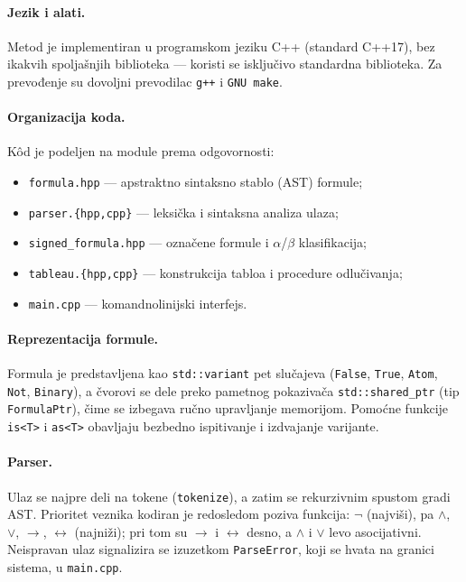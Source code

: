 \documentclass[a4paper,10pt]{article}
\begin{document}
\paragraph{Jezik i alati.}
Metod je implementiran u programskom jeziku C++ (standard C++17), bez ikakvih
spoljašnjih biblioteka --- koristi se isključivo standardna biblioteka. Za
prevođenje su dovoljni prevodilac \texttt{g++} i \texttt{GNU make}.

\paragraph{Organizacija koda.}
Kôd je podeljen na module prema odgovornosti:
\begin{itemize}
 \item \texttt{formula.hpp} --- apstraktno sintaksno stablo (AST) formule;
 \item \texttt{parser.\{hpp,cpp\}} --- leksička i sintaksna analiza ulaza;
 \item \texttt{signed\_formula.hpp} --- označene formule i $\alpha$/$\beta$
       klasifikacija;
 \item \texttt{tableau.\{hpp,cpp\}} --- konstrukcija tabloa i procedure
       odlučivanja;
 \item \texttt{main.cpp} --- komandnolinijski interfejs.
\end{itemize}

\paragraph{Reprezentacija formule.}
Formula je predstavljena kao \texttt{std::variant} pet slučajeva
(\texttt{False}, \texttt{True}, \texttt{Atom}, \texttt{Not}, \texttt{Binary}),
a čvorovi se dele preko pametnog pokazivača \texttt{std::shared\_ptr} (tip
\texttt{FormulaPtr}), čime se izbegava ručno upravljanje memorijom. Pomoćne
funkcije \texttt{is<T>} i \texttt{as<T>} obavljaju bezbedno ispitivanje i
izdvajanje varijante.

\paragraph{Parser.}
Ulaz se najpre deli na tokene (\texttt{tokenize}), a zatim se rekurzivnim
spustom gradi AST. Prioritet veznika kodiran je redosledom poziva funkcija:
$\neg$ (najviši), pa $\wedge$, $\vee$, $\rightarrow$, $\leftrightarrow$
(najniži); pri tom su $\rightarrow$ i $\leftrightarrow$ desno, a $\wedge$ i
$\vee$ levo asocijativni. Neispravan ulaz signalizira se izuzetkom
\texttt{ParseError}, koji se hvata na granici sistema, u \texttt{main.cpp}.
\end{document}
